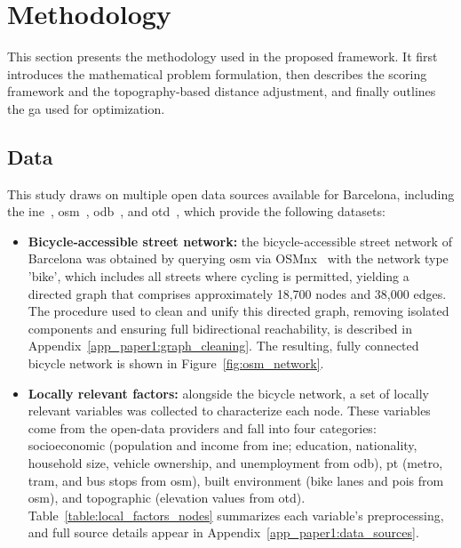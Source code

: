 \section{Methodology} \label{sec:station_planning_methodology}


This section presents the methodology used in the proposed framework. It first introduces the mathematical problem formulation, then describes the scoring framework and the topography-based distance adjustment, and finally outlines the \ac{ga} used for optimization.

\subsection{Data} \label{sec:station_planning_data}
    
    This study draws on multiple open data sources available for Barcelona, including the \acf{ine}~\cite{INE}, \acf{osm}~\cite{OpenStreetMap_web}, \acf{odb}~\cite{ODB}, and \acf{otd}~\cite{OTD}, which provide the following datasets:

    \begin{itemize}

        \item \textbf{Bicycle‐accessible street network:} the bicycle-accessible street network of Barcelona was obtained by querying \ac{osm} via OSMnx~\cite{OSMNx2025} with the network type 'bike', which includes all streets where cycling is permitted, yielding a directed graph that comprises approximately 18,700 nodes and 38,000 edges.  The procedure used to clean and unify this directed graph, removing isolated components and ensuring full bidirectional reachability, is described in Appendix~\ref{app_paper1:graph_cleaning}. The resulting, fully connected bicycle network is shown in Figure~\ref{fig:osm_network}.

        \item \textbf{Locally relevant factors:} alongside the bicycle network, a set of locally relevant variables was collected to characterize each node. These variables come from the open-data providers and fall into four categories: socioeconomic (population and income from \ac{ine}; education, nationality, household size, vehicle ownership, and unemployment from \ac{odb}), \ac{pt} (metro, tram, and bus stops from \ac{osm}), built environment (bike lanes and \acp{poi} from \ac{osm}), and topographic (elevation values from \ac{otd}). Table~\ref{table:local_factors_nodes} summarizes each variable's preprocessing, and full source details appear in Appendix~\ref{app_paper1:data_sources}.  

    \end{itemize}

